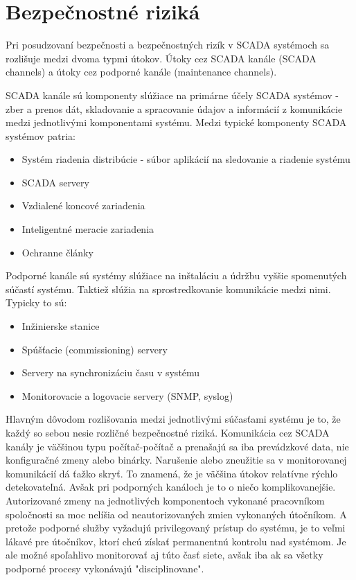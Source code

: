\section{Bezpečnostné riziká}
\tab Pri posudzovaní bezpečnosti a bezpečnostných rizík v SCADA systémoch sa rozlišuje medzi dvoma typmi útokov. Útoky cez SCADA kanále (SCADA channels) a útoky cez podporné kanále (maintenance channels)\cite{Security}. \par
SCADA kanále sú komponenty slúžiace na primárne účely SCADA systémov - zber a prenos dát, skladovanie a spracovanie údajov a informácií z komunikácie medzi jednotlivými komponentami systému. Medzi typické komponenty SCADA systémov patria:
\begin{itemize}
\item Systém riadenia distribúcie - súbor aplikácií na sledovanie a riadenie systému
\item SCADA servery
\item Vzdialené koncové zariadenia
\item Inteligentné meracie zariadenia
\item Ochranne články
\end{itemize}
Podporné kanále sú systémy slúžiace na inštaláciu a údržbu vyššie spomenutých súčastí systému. Taktiež slúžia na sprostredkovanie komunikácie medzi nimi. Typicky to sú:
\begin{itemize}
\item Inžinierske stanice
\item Spúšťacie (commissioning) servery
\item Servery na synchronizáciu času v systému
\item Monitorovacie a logovacie servery (SNMP, syslog)
\end{itemize} \par
Hlavným dôvodom rozlišovania medzi jednotlivými súčasťami systému je to, že každý so sebou nesie rozličné bezpečnostné riziká. Komunikácia cez SCADA kanály je väčšinou typu počítač-počítač a prenašajú sa iba prevádzkové data, nie konfiguračné zmeny alebo binárky. Narušenie alebo zneužitie sa v monitorovanej komunikácií dá ťažko skryť. To znamená, že je väčšina útokov relatívne rýchlo detekovateľná. Avšak pri podporných kanáloch je to o niečo komplikovanejšie. Autorizované zmeny na jednotlivých komponentoch vykonané pracovníkom spoločnosti sa moc nelíšia od neautorizovaných zmien vykonaných útočníkom. A pretože podporné služby vyžadujú privilegovaný prístup do systému, je to veľmi lákavé pre útočníkov, ktorí chcú získať permanentnú kontrolu nad systémom. Je ale možné spoľahlivo monitorovať aj túto časť siete, avšak iba ak sa všetky podporné procesy vykonávajú "disciplinovane". \par
